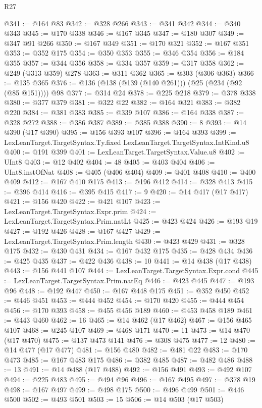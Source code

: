 \begin{lexlean}{R27}
\begin{coremodule}
@341 := @164 @83
@342 := @328 @266
@343 := @341 @342
@344 := @340 @343
@345 := @170 @338
@346 := @167 @345
@347 := @180 @307
@349 := @347 @91 @266
@350 := @167 @349
@351 := @170 @321
@352 := @167 @351
@353 := @352 @175
@354 := @350 @353
@355 := @346 @354
@356 := @184 @355
@357 := @344 @356
@358 := @334 @357
@359 := @317 @358
@362 := @249 (@313 @359) @278
@363 := @311 @362
@365 := @303 (@306 @363)
@366 := @135 @365
@376 := @136 (@138 (@139 (@140 @261))) (@25 (@234 (@92 (@85 @151)))) @98
@377 := @314 @24
@378 := @225 @218
@379 := @378 @338
@380 := @377 @379
@381 := @322 @22
@382 := @164 @321
@383 := @382 @220
@384 := @381 @383
@385 := @339 @107
@386 := @164 @338
@387 := @328 @272
@388 := @386 @387
@389 := @385 @388
@390 := 8
@393 := @14 @390 (@17 @390)
@395 := @156 @393 @107
@396 := @164 @393
@399 := LexLeanTarget.TargetSyntax.Ty.fixed LexLeanTarget.TargetSyntax.IntKind.u8
@400 := @191 @399
@401 := LexLeanTarget.TargetSyntax.Value.u8
@402 := UInt8
@403 := @12 @402
@404 := 48
@405 := @403 @404
@406 := UInt8.instOfNat
@408 := @405 (@406 @404)
@409 := @401 @408
@410 := @400 @409
@412 := @167 @410 @175
@413 := @196 @412
@414 := @328 @413
@415 := @396 @414
@416 := @395 @415
@417 := 9
@420 := @14 @417 (@17 @417)
@421 := @156 @420
@422 := @421 @107
@423 := LexLeanTarget.TargetSyntax.Expr.prim
@424 := LexLeanTarget.TargetSyntax.Prim.natLt
@425 := @423 @424
@426 := @193 @19
@427 := @192 @426
@428 := @167 @427
@429 := LexLeanTarget.TargetSyntax.Prim.length
@430 := @423 @429
@431 := @328 @175
@432 := @430 @431
@434 := @167 @432 @175
@435 := @428 @434
@436 := @425 @435
@437 := @422 @436
@438 := 10
@441 := @14 @438 (@17 @438)
@443 := @156 @441 @107
@444 := LexLeanTarget.TargetSyntax.Expr.cond
@445 := LexLeanTarget.TargetSyntax.Prim.natEq
@446 := @423 @445
@447 := @193 @96
@448 := @192 @447
@450 := @167 @448 @175
@451 := @352 @450
@452 := @446 @451
@453 := @444 @452
@454 := @170 @420
@455 := @444 @454
@456 := @170 @393
@458 := @455 @456 @189
@460 := @453 @458 @189
@461 := @443 @460
@462 := 16
@465 := @14 @462 (@17 @462)
@467 := @156 @465 @107
@468 := @245 @107
@469 := @468 @171
@470 := 11
@473 := @14 @470 (@17 @470)
@475 := @137 @473 @141
@476 := @308 @475
@477 := 12
@480 := @14 @477 (@17 @477)
@481 := @156 @480
@482 := @481 @22
@483 := @170 @473
@485 := @167 @483 @175
@486 := @382 @485
@487 := @482 @486
@488 := 13
@491 := @14 @488 (@17 @488)
@492 := @156 @491
@493 := @492 @107
@494 := @225 @483
@495 := @494 @96
@496 := @167 @495
@497 := @378 @19
@498 := @167 @497
@499 := @498 @175
@500 := @496 @499
@501 := @446 @500
@502 := @493 @501
@503 := 15
@506 := @14 @503 (@17 @503)

\end{coremodule}
\end{lexlean}
